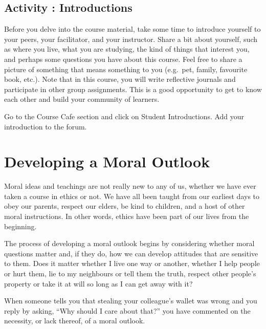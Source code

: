 \documentclass[
]{book}
\begin{document}
\begin{reflect}
\hypertarget{activity-introductions}{%
\subsection*{Activity : Introductions}\label{activity-introductions}}

Before you delve into the course material, take some time to introduce yourself to your peers, your facilitator, and your instructor. Share a bit about yourself, such as where you live, what you are studying, the kind of things that interest you, and perhaps some questions you have about this course. Feel free to share a picture of something that means something to you (e.g.~pet, family, favourite book, etc.).
Note that in this course, you will write reflective journals and participate in other group assignments. This is a good opportunity to get to know each other and build your community of learners.

Go to the Course Cafe section and click on Student Introductions. Add your introduction to the forum.
\end{reflect}

\hypertarget{developing-a-moral-outlook}{%
\section*{Developing a Moral Outlook}\label{developing-a-moral-outlook}}

Moral ideas and teachings are not really new to any of us, whether we have ever taken a course in ethics or not. We have all been taught from our earliest days to obey our parents, respect our elders, be kind to children, and a host of other moral instructions. In other words, ethics have been part of our lives from the beginning.

The process of developing a moral outlook begins by considering whether moral questions matter and, if they do, how we can develop attitudes that are sensitive to them. Does it matter whether I live one way or another, whether I help people or hurt them, lie to my neighbours or tell them the truth, respect other people's property or take it at will so long as I can get away with it?

When someone tells you that stealing your colleague's wallet was wrong and you reply by asking, ``Why should I care about that?'' you have commented on the necessity, or lack thereof, of a moral outlook.
\end{document}
